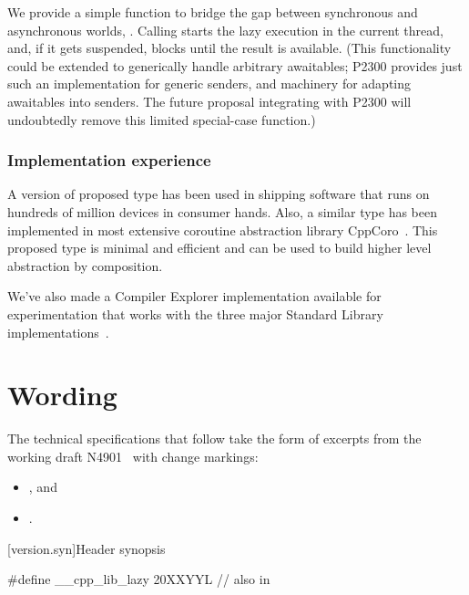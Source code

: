 We provide a simple function to bridge the gap between synchronous and asynchronous worlds, . Calling  starts the lazy execution in the current thread, and, if it gets suspended, blocks until the result is available.
(This functionality could be extended to generically handle arbitrary awaitables;
P2300 provides just such an implementation for generic senders,
and machinery for adapting awaitables into senders.
The future proposal integrating  with P2300 will undoubtedly
remove this limited special-case function.)

\subsection{Implementation experience}

A version of proposed type has been used in shipping software that runs on hundreds of million devices in consumer hands. Also, a similar type has been implemented in most extensive coroutine abstraction library CppCoro~\cite{CppCoro}. This proposed type is minimal and efficient and can be used to build higher level abstraction by composition.

We've also made a Compiler Explorer implementation available for experimentation that works with the three major Standard Library implementations~\cite{IMPL}.


\chapter{Wording}

The technical specifications that follow take the form of excerpts
from the working draft N4901~\cite{N4901} with change markings:
\begin{itemize}
\item {}, and
\item {}.
\end{itemize}

\setcounter{chapter}{17}
\setcounter{section}{3}
\setcounter{subsection}{1}
[version.syn]{Header  synopsis}


\begin{codeblock}
#define __cpp_lib_lazy                          20XXYYL // also in 
\end{codeblock}

